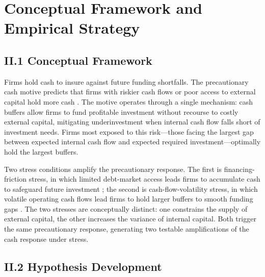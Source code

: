 
\section{Conceptual Framework and Empirical Strategy}
\label{sec:framework}

\subsection*{II.1 Conceptual Framework}
\label{sec:framework:conceptual}

Firms hold cash to insure against future funding shortfalls. The precautionary cash motive predicts that firms with riskier cash flows or poor access to external capital hold more cash \cite{opler1999,bates2009}. The motive operates through a single mechanism: cash buffers allow firms to fund profitable investment without recourse to costly external capital, mitigating underinvestment when internal cash flow falls short of investment needs. Firms most exposed to this risk---those facing the largest gap between expected internal cash flow and expected required investment---optimally hold the largest buffers.

Two stress conditions amplify the precautionary response. The first is financing-friction stress, in which limited debt-market access leads firms to accumulate cash to safeguard future investment \cite{almeida2004}; the second is cash-flow-volatility stress, in which volatile operating cash flows lead firms to hold larger buffers to smooth funding gaps \cite{hanqiu2007}. The two stresses are conceptually distinct: one constrains the supply of external capital, the other increases the variance of internal capital. Both trigger the same precautionary response, generating two testable amplifications of the cash response under stress.

\subsection*{II.2 Hypothesis Development}
\label{sec:framework:hypotheses}

